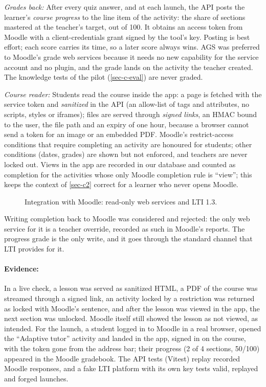 \emph{Grades back:} After every quiz answer, and at each launch, the API
posts the learner's \emph{course progress} to the line item of the
activity: the share of sections mastered at the teacher's target, out of
100. It obtains an access token from Moodle with a client-credentials
grant signed by the tool's key. Posting is best effort; each score carries
its time, so a later score always wins. AGS was preferred to Moodle's
grade web services because it needs no new capability for the service
account and no plugin, and the grade lands on the activity the teacher
created. The knowledge tests of the pilot (\cref{sec-c-eval}) are never
graded.

\emph{Course reader:} Students read the course inside the
app: a page is fetched with the service token and \emph{sanitized} in the
API (an allow-list of tags and attributes, no scripts, styles or
iframes); files are served through \emph{signed links}, an HMAC bound to
the user, the file path and an expiry of one hour, because a browser
cannot send a token for an image or an embedded PDF. Moodle's
restrict-access conditions that require completing an activity are
honoured for students; other conditions (dates, grades) are shown but not
enforced, and teachers are never locked out.
Views in the app are recorded in our database and counted as completion
for the activities whose only Moodle completion rule is ``view''; this
keeps the context of \cref{sec-c2} correct for a learner who never opens
Moodle.

\begin{figure}[htbp]
  \centering
  \caption{Integration with Moodle: read-only web services and LTI 1.3.}
  \label{fig-moodle-integration}
\end{figure}

Writing completion back to Moodle was considered and rejected: the only
web service for it is a teacher override, recorded as such in Moodle's
reports. The progress grade is the only write, and it goes through the
standard channel that LTI provides for it.

\paragraph{Evidence:} In a live check, a lesson was served as sanitized
HTML, a PDF of the course was streamed through a signed link, an activity
locked by a restriction was returned as locked with Moodle's sentence, and
after the lesson was viewed in the app, the next section was unlocked.
Moodle itself still showed the lesson as not viewed, as intended. For the
launch, a student logged in to Moodle in a real browser, opened the
``Adaptive tutor'' activity and landed in the app, signed in on the
course, with the token gone from the address bar; their progress
(2 of 4 sections, 50/100) appeared in the Moodle gradebook. The API tests
(Vitest) replay recorded Moodle responses, and a fake LTI platform with
its own key tests valid, replayed and forged launches.

